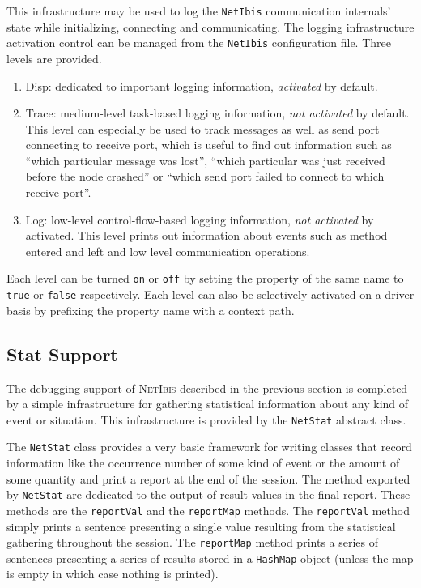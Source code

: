 \documentclass[11pt]{book}
\def\NetIbis{\textsc{NetIbis}\xspace}
\begin{document}
This infrastructure may be used to log the \texttt{NetIbis}
communication internals' state while initializing, connecting and
communicating. The logging infrastructure activation control can be
managed from the \texttt{NetIbis} configuration file. Three levels are
provided.
\begin{enumerate}
\item Disp: dedicated to important logging information,
  \emph{activated} by default.
\item Trace: medium-level task-based logging information, \emph{not
    activated} by default. This level can especially be used to track
  messages as well as send port connecting to receive port, which is
  useful to find out information such as ``which particular message
  was lost'', ``which particular was just received before the node
  crashed'' or ``which send port failed to connect to which receive
  port''.
\item Log: low-level control-flow-based logging information, \emph{not
    activated} by activated. This level prints out information about
  events such as method entered and left and low level communication
  operations.
\end{enumerate}
Each level can be turned \texttt{on} or \texttt{off} by setting the
property of the same name to \texttt{true} or \texttt{false}
respectively. Each level can also be selectively activated on a driver
basis by prefixing the property name with a context path.

\subsection{Stat Support}
\label{sec:stat-support}
The debugging support of \NetIbis described in the previous section is
completed by a simple infrastructure for gathering statistical
information about any kind of event or situation. This infrastructure
is provided by the \texttt{NetStat} abstract class.

The \texttt{NetStat} class provides a very basic framework for writing
classes that record information like the occurrence number of some
kind of event or the amount of some quantity and print a report at the
end of the session. The method exported by \texttt{NetStat} are
dedicated to the output of result values in the final report. These
methods are the \texttt{reportVal} and the \texttt{reportMap} methods.
The \texttt{reportVal} method simply prints a sentence presenting a
single value resulting from the statistical gathering throughout the
session. The \texttt{reportMap} method prints a series of sentences
presenting a series of results stored in a \texttt{HashMap} object
(unless the map is empty in which case nothing is printed).
\end{document}
